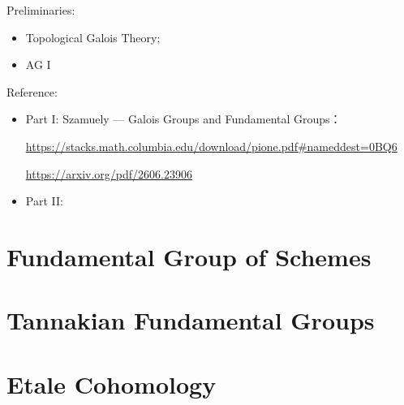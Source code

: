 \documentclass[Total.tex]{subfiles}
\begin{document}
	Preliminaries:
	\begin{itemize}
		\item Topological Galois Theory;
		\item AG I
	\end{itemize}
	Reference:
	\begin{itemize}
		\item Part I: Szamuely — Galois Groups and Fundamental Groups：
		
		\url{https://stacks.math.columbia.edu/download/pione.pdf#nameddest=0BQ6}
		
		\url{https://arxiv.org/pdf/2606.23906}
		\item Part II:
	\end{itemize}
	\chapter{Fundamental Group of Schemes}
	\chapter{Tannakian Fundamental Groups}
	\chapter{Etale Cohomology}
\end{document}
